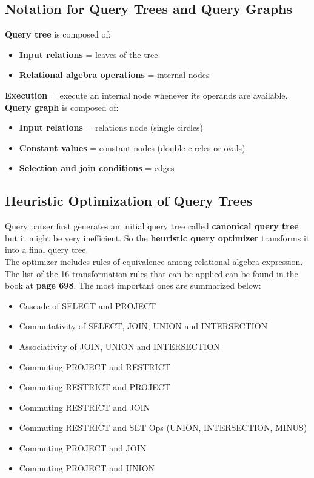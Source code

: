 \subsection{Notation for Query Trees and Query Graphs}

\textbf{Query tree} is composed of:

\begin{itemize}
    \item \textbf{Input relations} = leaves of the tree
    \item \textbf{Relational algebra operations} = internal nodes
\end{itemize}

\textbf{Execution} = execute an internal node whenever its operands are available.\\

\textbf{Query graph} is composed of:

\begin{itemize}
    \item \textbf{Input relations} = relations node (single circles)
    \item \textbf{Constant values} = constant nodes (double circles or ovals)
    \item \textbf{Selection and join conditions} = edges
\end{itemize}

\subsection{Heuristic Optimization of Query Trees}

Query parser first generates an initial query tree called \textbf{canonical query tree} but it might be very inefficient. So the \textbf{heuristic query optimizer} transforms it into a final query tree.\\

The optimizer includes rules of equivalence among relational algebra expression. \\

The list of the 16 transformation rules that can be applied can be found in the book at \textbf{page 698}. The most important ones are summarized below:\\

\begin{itemize}
    \item Cascade of SELECT and PROJECT
    \item Commutativity of SELECT, JOIN, UNION and INTERSECTION
    \item Associativity of JOIN, UNION and INTERSECTION
    \item Commuting PROJECT and RESTRICT
    \item Commuting RESTRICT and PROJECT
    \item Commuting RESTRICT and JOIN
    \item Commuting RESTRICT and SET Ops (UNION, INTERSECTION, MINUS)
    \item Commuting PROJECT and JOIN
    \item Commuting PROJECT and UNION
\end{itemize}

